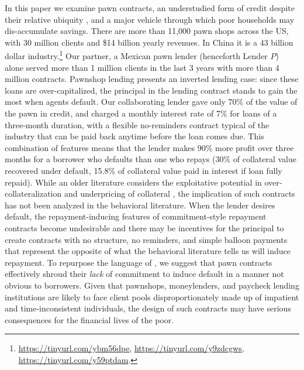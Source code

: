 \documentclass[oneside,11pt]{article}
\begin{document}
In this paper we examine pawn contracts, an understudied form of credit despite their relative ubiquity \citep{carter2012pawnshops}, and a major vehicle through which poor households may dis-accumulate savings.  There are more than 11,000 pawn shops across the US, with 30 million clients and \$14 billion yearly revenues.  In China it is a 43 billion dollar industry.\footnote{\url{https://tinyurl.com/ybm56dpe}, \url{https://tinyurl.com/y9zdcgws}, \url{https://tinyurl.com/y59ptdam}.} Our partner, a Mexican pawn lender (henceforth Lender $P$) alone served more than 1 million clients in the last 3 years with more than 4 million contracts.  Pawnshop lending presents an inverted lending case:  since these loans are over-capitalized, the principal in the lending contract stands to gain the most when agents default.  Our collaborating lender gave only 70\% of the value of the pawn in credit, and charged a monthly interest rate of 7\% for loans of a three-month duration, with a flexible no-reminders contract typical of the industry that can be paid back anytime before the loan comes due.  This combination of features means that the lender makes 90\% more profit over three months for a borrower who defaults than one who repays (30\% of collateral value recovered under default, 15.8\% of collateral value paid in interest if loan fully repaid).  While an older literature considers the exploitative potential in over-collateralization and underpricing of collateral \citep{basu1984implicit}, the implication of such contracts has not been analyzed in the behavioral literature.  When the lender desires default, the repayment-inducing features of commitment-style repayment contracts become undesirable and there may be incentives for the principal to create contracts with no structure, no reminders, and simple balloon payments that represent the opposite of what the behavioral literature tells us will induce repayment. To repurpose the language of \cite{Laibson2018}, we suggest that pawn contracts effectively shroud their \textit{lack} of commitment to induce default in a manner not obvious to borrowers.  Given that pawnshops, moneylenders, and paycheck lending institutions are likely to face client pools disproportionately made up of impatient and time-inconsistent individuals, the design of such contracts may have serious consequences for the financial lives of the poor.
\end{document}

